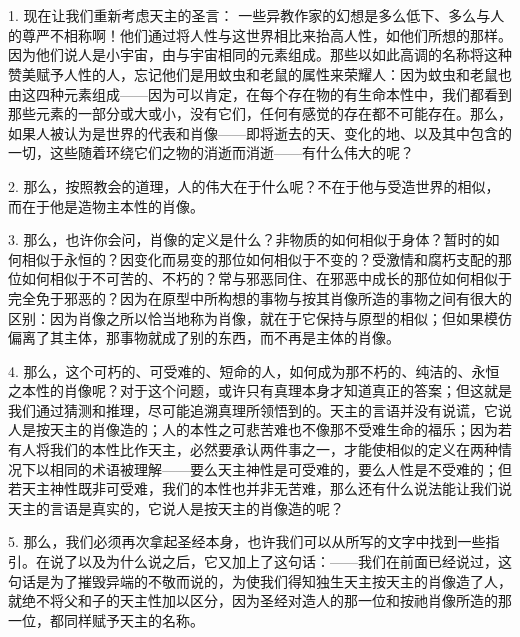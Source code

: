 
\section{}

1. 现在让我们重新考虑天主的圣言： 一些异教作家的幻想是多么低下、多么与人的尊严不相称啊！他们通过将人性与这世界相比来抬高人性，如他们所想的那样。因为他们说人是小宇宙，由与宇宙相同的元素组成。那些以如此高调的名称将这种赞美赋予人性的人，忘记他们是用蚊虫和老鼠的属性来荣耀人：因为蚊虫和老鼠也由这四种元素组成——因为可以肯定，在每个存在物的有生命本性中，我们都看到那些元素的一部分或大或小，没有它们，任何有感觉的存在都不可能存在。那么，如果人被认为是世界的代表和肖像——即将逝去的天、变化的地、以及其中包含的一切，这些随着环绕它们之物的消逝而消逝——有什么伟大的呢？\par

2. 那么，按照教会的道理，人的伟大在于什么呢？不在于他与受造世界的相似，而在于他是造物主本性的肖像。\par

3. 那么，也许你会问，肖像的定义是什么？非物质的如何相似于身体？暂时的如何相似于永恒的？因变化而易变的那位如何相似于不变的？受激情和腐朽支配的那位如何相似于不可苦的、不朽的？常与邪恶同住、在邪恶中成长的那位如何相似于完全免于邪恶的？因为在原型中所构想的事物与按其肖像所造的事物之间有很大的区别：因为肖像之所以恰当地称为肖像，就在于它保持与原型的相似；但如果模仿偏离了其主体，那事物就成了别的东西，而不再是主体的肖像。\par

4. 那么，这个可朽的、可受难的、短命的人，如何成为那不朽的、纯洁的、永恒之本性的肖像呢？对于这个问题，或许只有真理本身才知道真正的答案；但这就是我们通过猜测和推理，尽可能追溯真理所领悟到的。天主的言语并没有说谎，它说人是按天主的肖像造的；人的本性之可悲苦难也不像那不受难生命的福乐；因为若有人将我们的本性比作天主，必然要承认两件事之一，才能使相似的定义在两种情况下以相同的术语被理解——要么天主神性是可受难的，要么人性是不受难的；但若天主神性既非可受难，我们的本性也并非无苦难，那么还有什么说法能让我们说天主的言语是真实的，它说人是按天主的肖像造的呢？\par

5. 那么，我们必须再次拿起圣经本身，也许我们可以从所写的文字中找到一些指引。在说了以及为什么说之后，它又加上了这句话：——我们在前面已经说过，这句话是为了摧毁异端的不敬而说的，为使我们得知独生天主按天主的肖像造了人，就绝不将父和子的天主性加以区分，因为圣经对造人的那一位和按祂肖像所造的那一位，都同样赋予天主的名称。\par

